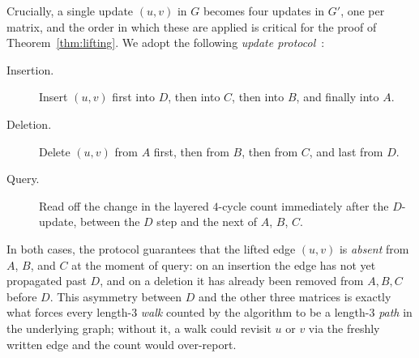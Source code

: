 \documentclass[sigconf,nonacm]{acmart}
\theoremstyle{plain}
\theoremstyle{definition}
\begin{document}
Crucially, a single update $(u, v)$ in $G$ becomes four updates in
$G'$, one per matrix, and the order in which these are applied is
critical for the proof of Theorem~\ref{thm:lifting}. We adopt the
following \emph{update protocol}~\cite{AssadiShah25}:
\begin{description}
  \item[Insertion.] Insert $(u, v)$ first into $D$, then into $C$,
        then into $B$, and finally into $A$.
  \item[Deletion.] Delete $(u, v)$ from $A$ first, then from $B$,
        then from $C$, and last from $D$.
  \item[Query.] Read off the change in the layered $4$-cycle count
        immediately after the $D$-update, between the $D$ step and
        the next of $A$, $B$, $C$.
\end{description}
In both cases, the protocol guarantees that the lifted edge $(u, v)$
is \emph{absent} from $A$, $B$, and $C$ at the moment of query: on an
insertion the edge has not yet propagated past $D$, and on a deletion
it has already been removed from $A, B, C$ before $D$. This asymmetry
between $D$ and the other three matrices is exactly what forces every
length-$3$ \emph{walk} counted by the algorithm to be a length-$3$
\emph{path} in the underlying graph; without it, a walk could revisit
$u$ or $v$ via the freshly written edge and the count would
over-report.
\end{document}

